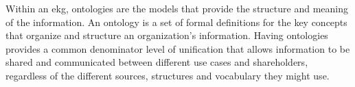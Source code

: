 %
%
Within an \gls{ekg}, ontologies are the models that provide the structure and meaning of the information.
An ontology is a set of formal definitions for the key concepts that organize and structure an
organization’s information.
Having ontologies provides a common denominator level of unification that allows information to be shared and
communicated between different use cases and shareholders, regardless of the different sources,
structures and vocabulary they might use.

%
